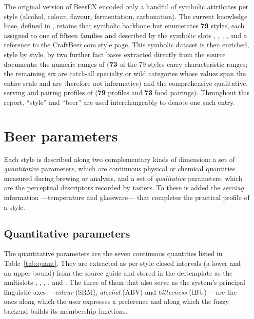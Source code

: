 The original version of BeerEX encoded only a handful of symbolic attributes per
style (alcohol, colour, flavour, fermentation, carbonation). The current
knowledge base, defined in , retains that symbolic
backbone but enumerates \textbf{79} styles, each assigned to one of fifteen
families and described by the symbolic slots , ,
, ,  and a reference
 to the CraftBeer.com style page. This symbolic dataset is then
enriched, style by style, by two further fact bases extracted directly from the
source documents: the numeric ranges of 
(\textbf{73} of the 79 styles carry characteristic ranges; the remaining six are
catch-all specialty or wild categories whose values span the entire scale and are
therefore not informative) and the comprehensive qualitative, serving and pairing
profiles of  (\textbf{79} profiles and \textbf{73}
food pairings). Throughout this report, ``style'' and ``beer'' are used
interchangeably to denote one such entry.

\section{Beer parameters}

Each style is described along two complementary kinds of dimension: a set of
\emph{quantitative} parameters, which are continuous physical or chemical
quantities measured during brewing or analysis, and a set of \emph{qualitative}
parameters, which are the perceptual descriptors recorded by tasters. To these is
added the \emph{serving} information ---temperature and glassware--- that
completes the practical profile of a style.

\subsection{Quantitative parameters}

The quantitative parameters are the seven continuous quantities listed in
Table~\ref{tab:quant}. They are extracted as per-style closed intervals
(a lower and an upper bound) from the source guide and stored in the
 deftemplate as the multislots , ,
, ,  and . The three of them that also
serve as the system's principal linguistic axes ---\emph{colour} (SRM),
\emph{alcohol} (ABV) and \emph{bitterness} (IBU)--- are the ones along which the
user expresses a preference and along which the fuzzy backend builds its
membership functions.

